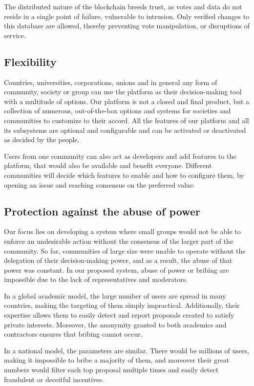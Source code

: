 \documentclass[a4paper,11pt]{article}
\begin{document}
\begin{multicols}{2}
The distributed nature of the blockchain breeds trust, as votes and data do not reside in a single point of failure, vulnerable to intrusion. Only verified changes to this database are allowed, thereby preventing vote manipulation, or disruptions of service.

\subsection{Flexibility} \label{flexibility}

Countries, universities, corporations, unions and in general any form of community, society or group can use the platform as their decision-making tool with a multitude of options. Our platform is not a closed and final product, but a collection of numerous, out-of-the-box options and systems for societies and communities to customize to their accord. All the features of our platform and all its subsystems are optional and configurable and can be activated or deactivated as decided by the people.

Users from one community can also act as developers and add features to the platform, that would also be available and benefit everyone. Different communities will decide which features to enable and how to configure them, by opening an issue and reaching consensus on the preferred value.

\subsection{Protection against the abuse of power} \label{abuse}

Our focus lies on developing a system where small groups would not be able to enforce an undesirable action without the consensus of the larger part of the community. So far, communities of large size were unable to operate without the delegation of their decision-making power, and as a result, the abuse of that power was constant. In our proposed system, abuse of power or bribing are impossible due to the lack of representatives and moderators.

In a global academic model, the large number of users are spread in many countries, making the targeting of them simply impractical. Additionally, their expertise allows them to easily detect and report proposals created to satisfy private interests. Moreover, the anonymity granted to both academics and contractors ensures that bribing cannot occur.

In a national model, the parameters are similar. There would be millions of users, making it impossible to bribe a majority of them, and moreover their great numbers would filter each top proposal multiple times and easily detect fraudulent or deceitful incentives.


\end{multicols}
\end{document}
